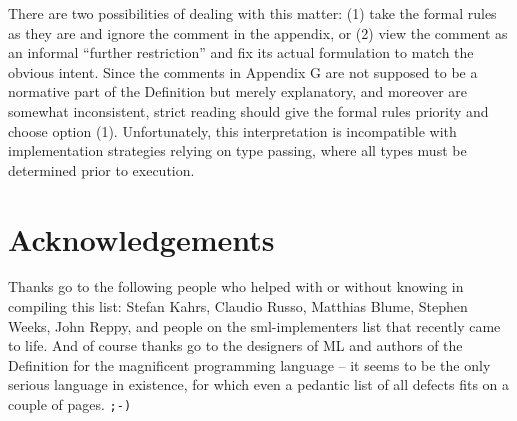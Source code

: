\documentclass{article}
\begin{document}
There are two possibilities of dealing with this matter: (1) take the formal rules as they are and ignore the comment in the appendix, or (2) view the comment as an informal ``further restriction'' and fix its actual formulation to match the obvious intent. Since the comments in Appendix G are not supposed to be a normative part of the Definition but merely explanatory, and moreover are somewhat inconsistent, strict reading should give the formal rules priority and choose option (1). Unfortunately, this interpretation is incompatible with implementation strategies relying on type passing, where all types must be determined prior to execution.



\section*{Acknowledgements}
\label{acknowledgements}

Thanks go to the following people who helped with or without knowing in compiling this list: Stefan Kahrs, Claudio Russo, Matthias Blume, Stephen Weeks, John Reppy, and people on the sml-implementers list that recently came to life. And of course thanks go to the designers of ML and authors of the Definition for the magnificent programming language -- it seems to be the only serious language in existence, for which even a pedantic list of all defects fits on a couple of pages. {\tt ;-)}
\end{document}
